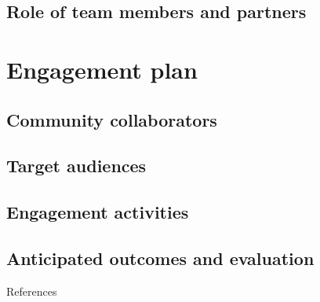 \documentclass[12pt]{elsarticle}
\begin{document}
\subsection{Role of team members and partners}

%
\section{Engagement plan}
\subsection{Community collaborators} 
\subsection{Target audiences}
\subsection{Engagement activities}
\subsection{Anticipated outcomes and evaluation}

\clearpage
\large References\\
\normalsize

\end{document}
